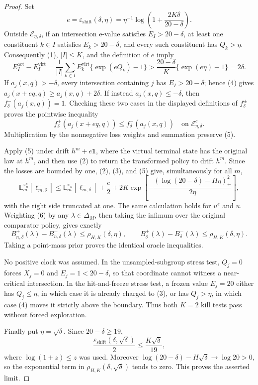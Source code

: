 \documentclass{article}
\begin{document}
\begin{proof}
Set
\[
e=\varepsilon_{\mathrm{shift}}(\delta,\eta)
=\eta^{-1}\log\!\left(1+\frac{2K\delta}{20-\delta}\right).
\]
Outside \(\mathcal E_{\eta,\delta}\), if an intersection e-value satisfies
\(E_I>20-\delta\), at least one constituent \(k\in I\) satisfies
\(E_k>20-\delta\), and every such constituent has \(Q_k>\eta\).
Consequently (1), \(|I|\leq K\), and the definition of \(e\) imply
\[
E_I^{\mathrm{act}}-E_I^{\mathrm{virt}}
=\frac1{|I|}\sum_{k\in I}E_k^{\mathrm{virt}}
 \{\exp(eQ_k)-1\}
>\frac{20-\delta}{K}\{\exp(e\eta)-1\}
=2\delta.
\tag{4}
\]
If \(a_j(x,q)>-\delta\), every intersection containing \(j\) has
\(E_I>20-\delta\); hence (4) gives
\(a_j(x+eq,q)\geq a_j(x,q)+2\delta\).
If instead \(a_j(x,q)\leq-\delta\), then
\(f_\delta^-(a_j(x,q))=1\).  Checking these two cases in the displayed
definitions of \(f_\delta^\pm\) proves the pointwise inequality
\[
f_\delta^+\!\left(a_j(x+eq,q)\right)
\leq f_\delta^-\!\left(a_j(x,q)\right)
\quad\text{on }\mathcal E_{\eta,\delta}^c.
\tag{5}
\]
Multiplication by the nonnegative loss weights and summation preserve (5).

Apply (5) under drift \(h^m+e\mathbf 1\), where the virtual terminal state has
the original law at \(h^m\), and then use (2) to return the transformed policy
to drift \(h^m\).  Since the losses are bounded by one, (2), (3), and (5) give,
simultaneously for all \(m\),
\[
\mathbb E_m^{\pi_n^e}[\ell_{m,\delta}^+]
\leq
\mathbb E_m^{\pi_n}[\ell_{m,\delta}^-]
+\frac e2
+2K\exp\!\left[
-\frac{(\log(20-\delta)-H\eta)_+^2}{2\eta}
\right],
\tag{6}
\]
with the right side truncated at one.  The same calculation holds for
\(u^e\) and \(u\).  Weighting (6) by any \(\lambda\in\Delta_M\), then taking
the infimum over the original comparator policy, gives exactly
\[
B_{n,\delta}^+(\lambda)-B_{n,\delta}^-(\lambda)
\leq\rho_{H,K}(\delta,\eta),
\qquad
B_\delta^+(\lambda)-B_\delta^-(\lambda)
\leq\rho_{H,K}(\delta,\eta).
\]
Taking a point-mass prior proves the identical oracle inequalities.

No positive clock was assumed.  In the unsampled-subgroup stress test,
\(Q_j=0\) forces \(X_j=0\) and \(E_j=1<20-\delta\), so that coordinate cannot
witness a near-critical intersection.  In the hit-and-freeze stress test,
a frozen value \(E_j=20\) either has \(Q_j\leq\eta\), in which case it is
already charged to (3), or has \(Q_j>\eta\), in which case (4) moves it
strictly above the boundary.  Thus both \(K=2\) kill tests pass without
forced exploration.

Finally put \(\eta=\sqrt\delta\).  Since \(20-\delta\geq19\),
\[
\frac{\varepsilon_{\mathrm{shift}}(\delta,\sqrt\delta)}2
\leq \frac{K\sqrt\delta}{19},
\]
where \(\log(1+z)\leq z\) was used.  Moreover
\(\log(20-\delta)-H\sqrt\delta\to\log20>0\), so the exponential term in
\(\rho_{H,K}(\delta,\sqrt\delta)\) tends to zero.  This proves the asserted
limit.
\end{proof}
\end{document}
